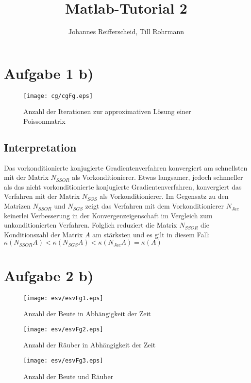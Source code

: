 \documentclass[german]{article}
\author{Johannes Reifferscheid, Till Rohrmann}
\title{
	Matlab-Tutorial 2
}
\begin{document}
	\maketitle
 
   \section*{Aufgabe 1 b)}
   	\begin{figure}[H]
   		\centerline{\texttt{[image: cg/cgFg.eps]}}
   		\caption{Anzahl der Iterationen zur approximativen Lösung einer Poissonmatrix}
   	\end{figure}
   	
   	\subsection*{Interpretation}
   		Das vorkonditionierte konjugierte Gradientenverfahren konvergiert am schnellsten mit der Matrix $N_{SSOR}$ als Vorkonditionierer.
   		Etwas langsamer, jedoch schnneller als das nicht vorkonditionierte konjugierte Gradientenverfahren,
   		konvergiert das Verfahren mit der Matrix $N_{SGS}$ als Vorkonditionierer. Im Gegensatz zu den Matrizen
   		$N_{SSOR}$ und $N_{SGS}$ zeigt das Verfahren mit dem Vorkonditionierer $N_{Jac}$ keinerlei Verbesserung
   		in der Konvergenzeigenschaft im Vergleich zum unkonditionierten Verfahren. Folglich reduziert die Matrix
   		$N_{SSOR}$ die Konditionszahl der Matrix $A$ am stärksten und es gilt in diesem Fall: 
   		$\kappa({N_{SSOR}A}) < \kappa({N_{SGS}A}) < \kappa({N_{Jac}A})=\kappa({A})$
   	
   \section*{Aufgabe 2 b)}
   
   	\begin{figure}[H]
			\centerline{\texttt{[image: esv/esvFg1.eps]}}
			\caption{Anzahl der Beute in Abhängigkeit der Zeit}
		\end{figure}
		\begin{figure}[H]
			\centerline{\texttt{[image: esv/esvFg2.eps]}}
			\caption{Anzahl der Räuber in Abhängigkeit der Zeit}
		\end{figure}
		\begin{figure}[H]
			\centerline{\texttt{[image: esv/esvFg3.eps]}}
			\caption{Anzahl der Beute und Räuber}
		\end{figure}
		
\end{document}
